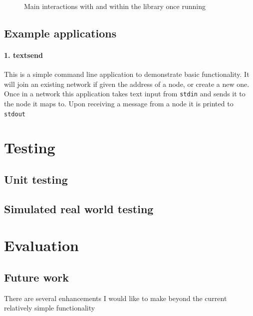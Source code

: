 \documentclass{article}
\begin{document}
\begin{figure}
\centering
\def\svgwidth{1.4\columnwidth}
\begin{scriptsize}
\makebox[\columnwidth][c]{}
\end{scriptsize}
\caption{Main interactions with and within the library once running }
\label{fig:runlib}
\end{figure}

\subsection{Example applications}

\paragraph{1. textsend}

This is a simple command line application to demonstrate basic functionality. It will join an existing network if given the address of a node, or create a new one. Once in a network this application takes text input from \texttt{stdin} and sends it to the node it maps to. Upon receiving a message from a node it is printed to \texttt{stdout}

\section{Testing}

\subsection{Unit testing}

\subsection{Simulated real world testing}

\section{Evaluation}

\subsection{Future work}

There are several enhancements I would like to make beyond the current relatively simple functionality
\end{document}

